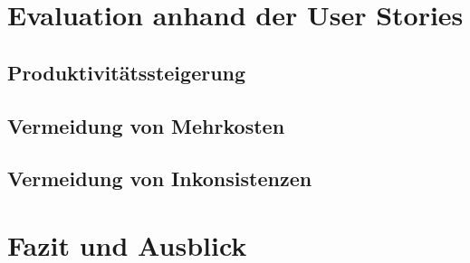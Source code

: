 \documentclass[12pt,titlepage]{scrartcl}
\begin{document}
	\section{Evaluation anhand der User Stories} \label{eval}
			\subsection{Produktivitätssteigerung}
			\subsection{Vermeidung von Mehrkosten}
			\subsection{Vermeidung von Inkonsistenzen}
	\newpage	
	\section{Fazit und Ausblick}
	
\end{document}
